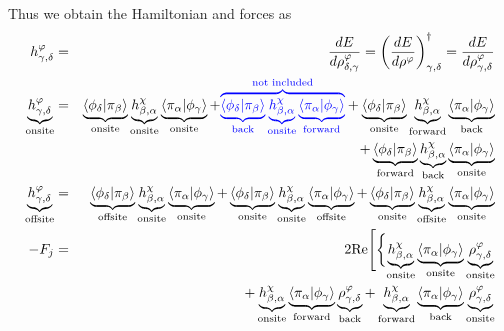 \documentclass[11pt,a4paper]{report}
\begin{document}
Thus we obtain the Hamiltonian and forces as
\begin{eqnarray}
h^{\varphi}_{\gamma,\delta}
&=&\frac{dE}{d\rho^{\varphi}_{\delta,\gamma}}
=\left(\frac{dE}{d\rho^{\varphi}}\right)^\dagger_{\gamma,\delta}
=\frac{dE}{d\rho^{\varphi}_{\gamma,\delta}}
\nonumber\\
\underbrace{h^{\varphi}_{\gamma,\delta}}_{\text{onsite}}
&=&
\underbrace{\langle\phi_\delta|\pi_\beta\rangle}_{\text{onsite}}
\underbrace{h^{\chi}_{\beta,\alpha}}_{\text{onsite}}
\underbrace{\langle\pi_\alpha|\phi_\gamma\rangle}_{\text{onsite}}
+
\textcolor{blue}{\overbrace{
\underbrace{\langle\phi_\delta|\pi_\beta\rangle}_{\text{back}}
\underbrace{h^{\chi}_{\beta,\alpha}}_{\text{onsite}}
\underbrace{\langle\pi_\alpha|\phi_\gamma\rangle}_{\text{forward}}
}^{\text{not included}}}
+
\underbrace{\langle\phi_\delta|\pi_\beta\rangle}_{\text{onsite}}
\underbrace{h^{\chi}_{\beta,\alpha}}_{\text{forward}}
\underbrace{\langle\pi_\alpha|\phi_\gamma\rangle}_{\text{back}}
\nonumber\\
&&+
\underbrace{\langle\phi_\delta|\pi_\beta\rangle}_{\text{forward}}
\underbrace{h^{\chi}_{\beta,\alpha}}_{\text{back}}
\underbrace{\langle\pi_\alpha|\phi_\gamma\rangle}_{\text{onsite}}
\nonumber\\
%
%
%
\underbrace{h^{\varphi}_{\gamma,\delta}}_{\text{offsite}}
&=&
\underbrace{\langle\phi_\delta|\pi_\beta\rangle}_{\text{offsite}}
\underbrace{h^{\chi}_{\beta,\alpha}}_{\text{onsite}}
\underbrace{\langle\pi_\alpha|\phi_\gamma\rangle}_{\text{onsite}}
+
\underbrace{\langle\phi_\delta|\pi_\beta\rangle}_{\text{onsite}}
\underbrace{h^{\chi}_{\beta,\alpha}}_{\text{onsite}}
\underbrace{\langle\pi_\alpha|\phi_\gamma\rangle}_{\text{offsite}}
+
\underbrace{\langle\phi_\delta|\pi_\beta\rangle}_{\text{onsite}}
\underbrace{h^{\chi}_{\beta,\alpha}}_{\text{offsite}}
\underbrace{\langle\pi_\alpha|\phi_\gamma\rangle}_{\text{onsite}}
\nonumber\\
%
%
%
-F_j&=&
2\Re\Biggl[\biggl\lbrace
\underbrace{h^{\chi}_{\beta,\alpha}}_{\text{onsite}}
\underbrace{\langle\pi_\alpha|\phi_\gamma\rangle}_{\text{onsite}}
\underbrace{\rho^{\varphi}_{\gamma,\delta}}_{\text{onsite}}
\nonumber\\
&&+
\underbrace{h^{\chi}_{\beta,\alpha}}_{\text{onsite}}
\underbrace{\langle\pi_\alpha|\phi_\gamma\rangle}_{\text{forward}}
\underbrace{\rho^{\varphi}_{\gamma,\delta}}_{\text{back}}
+
\underbrace{h^{\chi}_{\beta,\alpha}}_{\text{forward}}
\underbrace{\langle\pi_\alpha|\phi_\gamma\rangle}_{\text{back}}
\underbrace{\rho^{\varphi}_{\gamma,\delta}}_{\text{onsite}}

\end{eqnarray}
\end{document}
